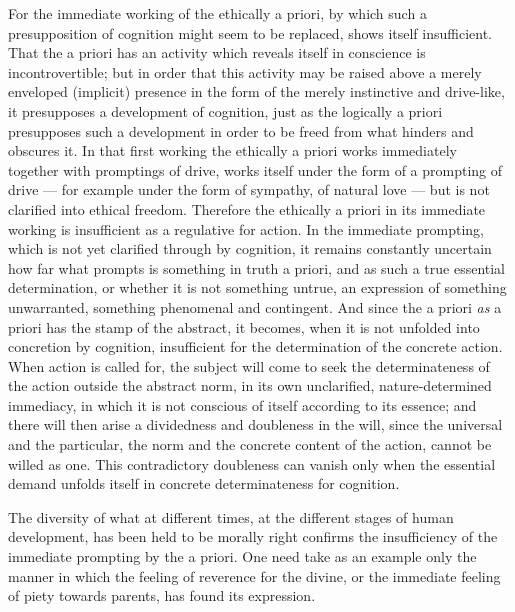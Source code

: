 \documentclass[12pt,a4paper]{book}
\begin{document}
For the immediate working of the ethically a priori, by which such a
presupposition of cognition might seem to be replaced, shows itself
insufficient. That the a priori has an activity which reveals itself in
conscience is incontrovertible; but in order that this activity may be raised
above a merely enveloped (implicit) presence in the form of the merely
instinctive and drive-like, it presupposes a development of cognition, just as
the logically a priori presupposes such a development in order to be freed
from what hinders and obscures it. In that first working the ethically a
priori works immediately together with promptings of drive, works itself under
the form of a prompting of drive --- for example under the form of sympathy,
of natural love --- but is not clarified into ethical freedom. Therefore the
ethically a priori in its immediate working is insufficient as a regulative
for action. In the immediate prompting, which is not yet clarified through by
cognition, it remains constantly uncertain how far what prompts is something
in truth a priori, and as such a true essential determination, or whether it
is not something untrue, an expression of something unwarranted, something
phenomenal and contingent. And since the a priori \emph{as} a priori has the
stamp of the abstract, it becomes, when it is not unfolded into concretion by
cognition, insufficient for the determination of the concrete action. When
action is called for, the subject will come to seek the determinateness of the
action outside the abstract norm, in its own unclarified, nature-determined
immediacy, in which it is not conscious of itself according to its essence;
and there will then arise a dividedness and doubleness in the will, since the
universal and the particular, the norm and the concrete content of the action,
cannot be willed as one. This contradictory doubleness can vanish only when
the essential demand unfolds itself in concrete determinateness for cognition.

The diversity of what at different times, at the different stages of human
development, has been held
to be morally right confirms the insufficiency of the immediate prompting by
the a priori. One need take as an example only the manner in which the feeling
of reverence for the divine, or the immediate feeling of piety towards
parents, has found its expression.
\end{document}
